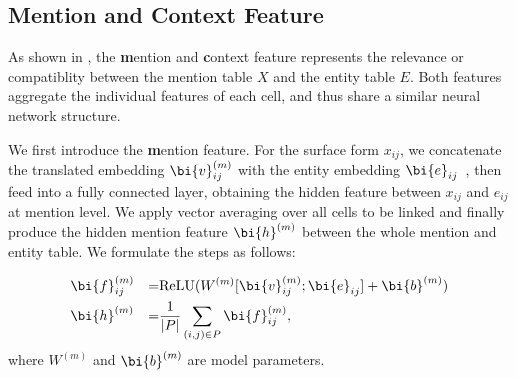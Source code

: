 \subsection{Mention and Context Feature}
\label{sec:cell}

As shown in , the \textbf{m}ention and \textbf{c}ontext feature represents
the relevance or compatiblity between the mention table $X$ and the entity table $E$.
Both features aggregate the individual features of each cell,
and thus share a similar neural network structure.

We first introduce the \textbf{m}ention feature.
For the surface form $x_{ij}$,
we concatenate the translated embedding $\bi{v}_{ij}^{(m)}$ with the entity embedding $\bi{e}_{ij}$~\cite{socher2013reasoning,socher2013recursive},
then feed into a fully connected layer,
obtaining the hidden feature between $x_{ij}$ and $e_{ij}$ at mention level.
We apply vector averaging over all cells to be linked
and finally produce the hidden mention feature $\bi{h}^{(m)}$
between the whole mention and entity table. 
We formulate the steps as follows:

\begin{equation}
  \label{eqn:cell}
  \begin{aligned}
    & \bi{f}_{ij}^{(m)} & = & \mbox{ReLU}(W^{(m)} [\bi{v}_{ij}^{(m)}; \bi{e}_{ij}] + \bi{b}^{(m)}) \\
    & \bi{h}^{(m)}      & = & \frac{1}{|P|} \sum_{(i,j) \in P} \bi{f}_{ij}^{(m)},
  \end{aligned}
\end{equation}
\noindent
where $W^{(m)}$ and $\bi{b}^{(m)}$ are model parameters.

%
%
%

